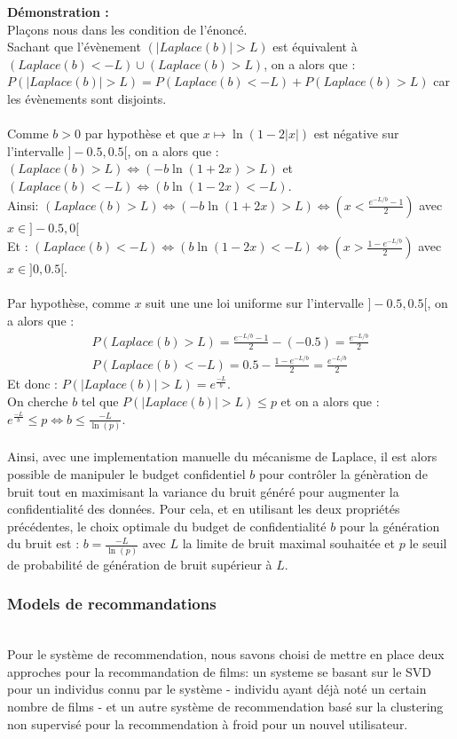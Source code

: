 \documentclass{article}
\begin{document}
                \textbf{Démonstration :}\\
                Plaçons nous dans les condition de l'énoncé.\\
                Sachant que l'évènement $(|Laplace(b)| > L)$ est équivalent à $(Laplace(b)<-L) \cup (Laplace(b)>L)$, on a alors que :
                \(P( |Laplace(b)| > L) = P(Laplace(b)<-L) + P(Laplace(b)>L) \) car les évènements sont disjoints.\\
                \\
                Comme $b>0$ par hypothèse et que $x\mapsto \ln(1 - 2|x|)$ est négative sur l'intervalle $]-0.5, 0.5[$, on a alors que :
                \( (Laplace(b)>L) \Leftrightarrow (-b \ln(1+2x)>L)\) et \( (Laplace(b)<-L) \Leftrightarrow (b \ln(1-2x)<-L)\). \\
                Ainsi: $ (Laplace(b)>L) \Leftrightarrow ( -b \ln(1+2x)>L) \Leftrightarrow (x < \frac{ e^{-L/b}-1}{2})$ avec $x\in]-0.5,0[$\\
Et : $ (Laplace(b)<-L) \Leftrightarrow ( b \ln(1-2x)<-L) \Leftrightarrow (x > \frac{ 1-e^{-L/b}}{2})$ avec $x\in]0,0.5[$.\\
\\
Par hypothèse, comme $x$ suit une une loi uniforme sur l'intervalle $]-0.5, 0.5[$, on a alors que :
\begin{align*}
    P(Laplace(b)>L) = \frac{ e^{-L/b}-1}{2} - (-0.5) = \frac{ e^{-L/b}}{2} \\
    P(Laplace(b)<-L) = 0.5 - \frac{ 1-e^{-L/b}}{2} = \frac{ e^{-L/b}}{2}
\end{align*}
Et donc : $P( |Laplace(b)| > L) = e^{\frac{-L}{b}}$.\\
On cherche $b$ tel que $P( |Laplace(b)| > L) \leq p$ et on a alors que : $e^{\frac{-L}{b}} \leq p \Leftrightarrow b \leq \frac{-L}{\ln(p)}$.\\
\\
Ainsi, avec une implementation manuelle du mécanisme de Laplace, il est alors possible de manipuler le budget confidentiel $b$ pour contrôler
la génèration de bruit tout en maximisant la variance du bruit généré pour augmenter la confidentialité des données. Pour cela, et en utilisant les deux propriétés précédentes,
le choix optimale du budget de confidentialité $b$ pour la génération du bruit est : $b = \frac{-L}{\ln(p)}$ avec $L$ la limite de bruit maximal souhaitée et $p$ le seuil de probabilité de génération de bruit supérieur à $L$.\\

\subsubsection{Models de recommandations}
$ $\\
Pour le système de recommendation, nous savons choisi de mettre en place deux approches pour la recommandation de films: un systeme se basant sur le SVD pour un
individus connu par le système - individu ayant déjà noté un certain nombre de films - et un autre système de recommendation basé sur la clustering non supervisé
pour la recommendation à froid pour un nouvel utilisateur.
\end{document}
